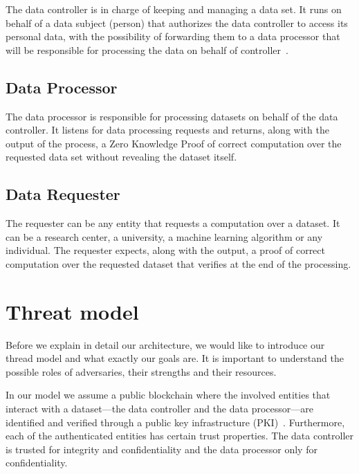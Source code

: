 The data controller is in charge of keeping and managing a data set. It runs on behalf of a data subject (person)
that authorizes the data controller to access its personal data, with the possibility of forwarding
them to a data processor that will be responsible for processing the data on behalf of controller~\cite{DBLP:journals/corr/NeisseSF17}.

\subsection{Data Processor}
\label{solution:entities:data_processor}

The data processor is responsible for processing datasets on behalf of the data controller. It listens for data processing requests and returns, along with the output of the process, a Zero Knowledge Proof of correct computation over the requested data set without revealing the dataset itself.

\subsection{Data Requester}
\label{solution:entities:data_req}

The requester can be any entity that requests a computation over a dataset. It can be a research center, a university, a machine learning algorithm or any individual. The requester expects, along with the output, a proof of correct computation over the requested dataset that verifies at the end of the processing.

\section{Threat model}
\label{solution:treat_model}

Before we explain in detail our architecture, we would like to introduce our thread model and what exactly our goals are. It is important to understand the possible roles of adversaries, their strengths and their resources.

In our model we assume a public blockchain where the involved entities that interact with a dataset---the data controller and the data processor---are identified and verified through a public key infrastructure (PKI)~\cite{adams_understanding_2003}. Furthermore, each of the authenticated entities has certain trust properties. Τhe data controller is trusted for integrity and confidentiality and the data processor only for confidentiality.

